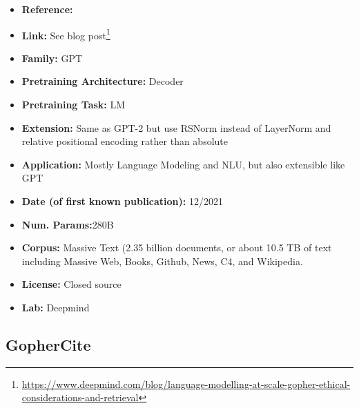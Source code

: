 \documentclass{article}
\begin{document}
            \begin{itemize}
                \item \textbf{Reference:} 
                \item \textbf{Link:} See blog post\footnote{\url{https://www.deepmind.com/blog/language-modelling-at-scale-gopher-ethical-considerations-and-retrieval}}
                \item \textbf{Family:} GPT 
                \item \textbf{Pretraining Architecture:} Decoder
                \item \textbf{Pretraining Task:} LM
                \item \textbf{Extension:} Same as GPT-2 but use RSNorm instead of LayerNorm and relative positional encoding rather than absolute  
                \item \textbf{Application:} Mostly Language Modeling and NLU, but also extensible like GPT
                \item \textbf{Date (of first known publication):} 12/2021
                \item \textbf{Num. Params:}280B
                \item \textbf{Corpus:} Massive Text (2.35 billion documents, or about 10.5 TB of text including Massive Web, Books, Github, News, C4, and Wikipedia.
                \item \textbf{License:} Closed source
                \item \textbf{Lab:} Deepmind
            \end{itemize}

\subsection{GopherCite}
\end{document}
